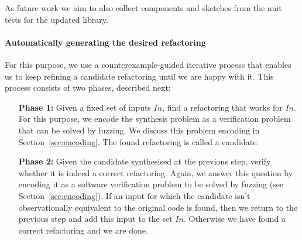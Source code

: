 \documentclass[runningheads,a4paper]{llncs}
\begin{document}



As future work we aim to also collect components and sketches from the  unit tests for the updated library.
 
\paragraph{{\bf Automatically generating the desired refactoring}}

For this purpose, we use a counterexample-guided iterative process that enables us to keep refining a candidate refactoring until we are happy with it. This process consists of two phases, described next:
  \begin{itemize}
  \item[{\bf Phase 1:}] Given a fixed set of inputs $In$, find a refactoring that works for $In$. For this purpose, we encode   
    the synthesis problem as a verification problem that can be solved by fuzzing. We discuss this problem encoding in
    Section~\ref{sec:encoding}. The found refactoring is called a candidate.
  \item[{\bf Phase 2:}] Given the candidate synthesised at the previous step, verify whether it is indeed a correct refactoring.
    Again, we answer this question by encoding it as a software verification problem to be solved by fuzzing (see Section~\ref{sec:encoding}).
    If an input for which the candidate isn't observationally equivalent to the original code is found, then
    we return to the previous step and add this input to the set $In$. Otherwise we have found a correct refactoring and we are done.
  \end{itemize}
\end{document}
